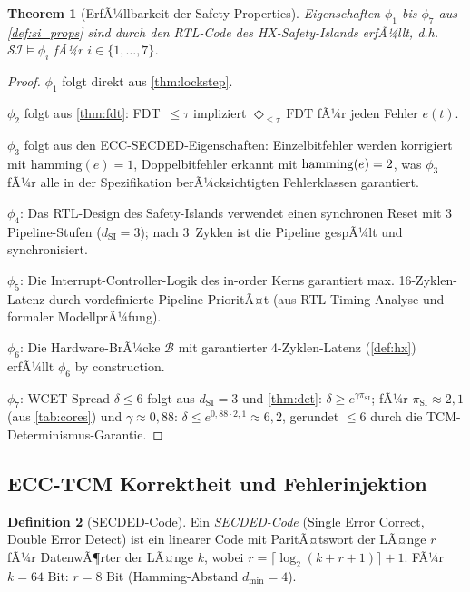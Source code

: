 ﻿\documentclass[a4paper,12pt]{article}
\theoremstyle{plain}
\newtheorem{theorem}{Theorem}[section]
\theoremstyle{definition}
\newtheorem{definition}[theorem]{Definition}
\theoremstyle{remark}
\begin{document}
\begin{theorem}[ErfÃ¼llbarkeit der Safety-Properties]\label{thm:sva_valid}
Eigenschaften $\phi_1$ bis $\phi_7$ aus \cref{def:si_props}
sind durch den RTL-Code des HX-Safety-Islands erfÃ¼llt,
d.h.\ $\mathcal{SI} \models \phi_i$ fÃ¼r $i \in \{1,\ldots,7\}$.
\end{theorem}
\begin{proof}
$\phi_1$ folgt direkt aus \cref{thm:lockstep}.

$\phi_2$ folgt aus \cref{thm:fdt}: FDT~$\leq \tau$ impliziert
$\Diamond_{\leq\tau}\,\mathrm{FDT}$ fÃ¼r jeden Fehler $e(t)$.

$\phi_3$ folgt aus den ECC-SECDED-Eigenschaften:
Einzelbitfehler werden korrigiert mit $\mathrm{hamming}(e) = 1$,
Doppelbitfehler erkannt mit $\mathrm{ham\-ming}(e) = 2$,
was $\phi_3$ fÃ¼r alle in der Spezifikation berÃ¼cksichtigten
Fehlerklassen garantiert.

$\phi_4$: Das RTL-Design des Safety-Islands verwendet einen
synchronen Reset mit 3 Pipeline-Stufen ($d_\mathrm{SI} = 3$);
nach 3~Zyklen ist die Pipeline gespÃ¼lt und synchronisiert.

$\phi_5$: Die Interrupt-Controller-Logik des in-order Kerns
garantiert max. 16-Zyklen-Latenz durch vordefinierte Pipeline-PrioritÃ¤t
(aus RTL-Timing-Analyse und formaler ModellprÃ¼fung).

$\phi_6$: Die Hardware-BrÃ¼cke $\mathcal{B}$ mit garantierter
4-Zyklen-Latenz (\cref{def:hx}) erfÃ¼llt $\phi_6$ by construction.

$\phi_7$: WCET-Spread $\delta \leq 6$ folgt aus $d_\mathrm{SI} = 3$
und \cref{thm:det}: $\delta \geq e^{\gamma\pi_\mathrm{SI}}$;
fÃ¼r $\pi_\mathrm{SI} \approx 2{,}1$ (aus \cref{tab:cores}) und
$\gamma \approx 0{,}88$: $\delta \leq e^{0{,}88 \cdot 2{,}1} \approx 6{,}2$,
gerundet $\leq 6$ durch die TCM-Determinismus-Garantie.
\end{proof}

\subsection{ECC-TCM Korrektheit und Fehlerinjektion}\label{ssec:ecc}

\begin{definition}[SECDED-Code]\label{def:secded}
Ein \emph{SECDED-Code} (Single Error Correct, Double Error Detect)
ist ein linearer Code mit ParitÃ¤tswort der LÃ¤nge $r$ fÃ¼r
DatenwÃ¶rter der LÃ¤nge $k$, wobei
$r = \lceil \log_2(k+r+1) \rceil + 1$.
FÃ¼r $k = 64$ Bit: $r = 8$ Bit (Hamming-Abstand $d_\mathrm{min} = 4$).
\end{definition}
\end{document}
